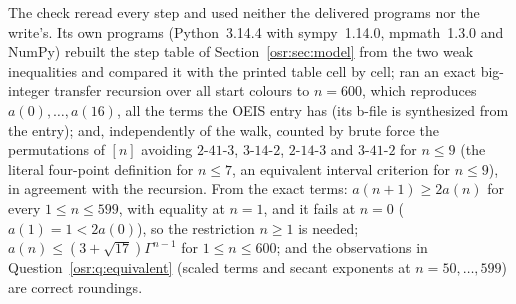 \documentclass[11pt,letterpaper]{article}
\newcommand{\G}{\Gamma}\newcommand{\s}{\sqrt{17}}
\numberwithin{equation}{section}
\begin{document}
The check reread every step and used neither the delivered programs nor the
write's. Its own programs (Python~3.14.4 with sympy~1.14.0, mpmath~1.3.0
and NumPy) rebuilt the step table of Section~\ref{osr:sec:model} from the
two weak inequalities and compared it with the printed table cell by cell;
ran an exact big-integer transfer recursion over all start colours to
$n=600$, which reproduces $a(0),\dots,a(16)$, all the terms the OEIS entry
has (its b-file is synthesized from the entry); and, independently of the
walk, counted by brute force the permutations of $[n]$ avoiding
$2\text{-}41\text{-}3$, $3\text{-}14\text{-}2$, $2\text{-}14\text{-}3$ and
$3\text{-}41\text{-}2$ for $n\le9$ (the literal four-point definition for
$n\le7$, an equivalent interval criterion for $n\le9$), in agreement with
the recursion. From the exact terms: $a(n+1)\ge2a(n)$ for every
$1\le n\le599$, with equality at $n=1$, and it fails at $n=0$
($a(1)=1<2a(0)$), so the restriction $n\ge1$ is needed; $a(n)\le(3+\s)\G^{n-1}$
for $1\le n\le600$; and the observations in Question~\ref{osr:q:equivalent} (scaled terms and
secant exponents at $n=50,\dots,599$) are correct roundings.
\end{document}
